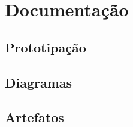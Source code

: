 \chapter{Documentação}
\label{apendice}
\clearpage

\section{Prototipação}
\label{prototipacao}

\clearpage

\section{Diagramas}
\label{diagramas}

\clearpage

\section{Artefatos}
\label{artefatos}


